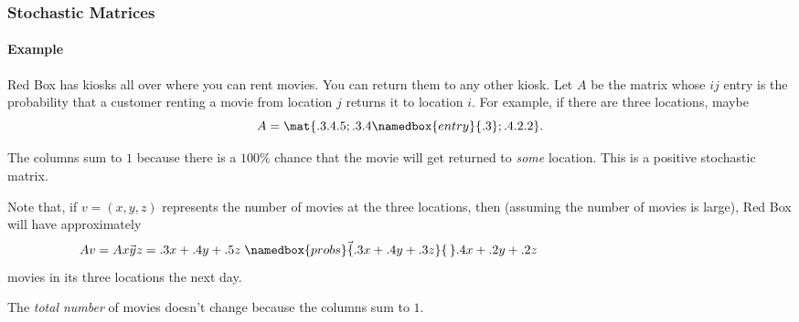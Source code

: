 \begin{frame}
\frametitle{Stochastic Matrices}
\framesubtitle{Example}

Red Box has kiosks all over where you can rent movies.  You can return them to
any other kiosk.
\pause
Let $A$ be the matrix whose $ij$ entry is the probability that a customer
renting a movie from location $j$ returns it to location $i$.
\pause
For example, if there are three locations, maybe
\[ A = \mat{.3 .4 .5; .3 .4 \namedbox{entry}{.3}; .4 .2 .2}. \]
%
\pause
The columns sum to $1$ because
\pause
there is a $100\%$ chance that the movie will get returned to \emph{some}
location.
\pause
This is a positive stochastic matrix.

\pause\medskip
Note that, if $v = (x, y, z)$ represents the number of movies at the three
locations, then (assuming the number of movies is large), Red Box will have
approximately
\pause
\[ Av = A\vec{x y z} = 
\vec{.3x+.4y+.5z{\;} \namedbox{probs}{.3x+.4y+.3z}{\,} .4x+.2y+.2z{\,}}
\hskip5cm \]
movies in its three locations the next day.
\pause
{}%
\pause
The \emph{total number} of movies doesn't change because
\pause
the columns sum to $1$.

\end{frame}



